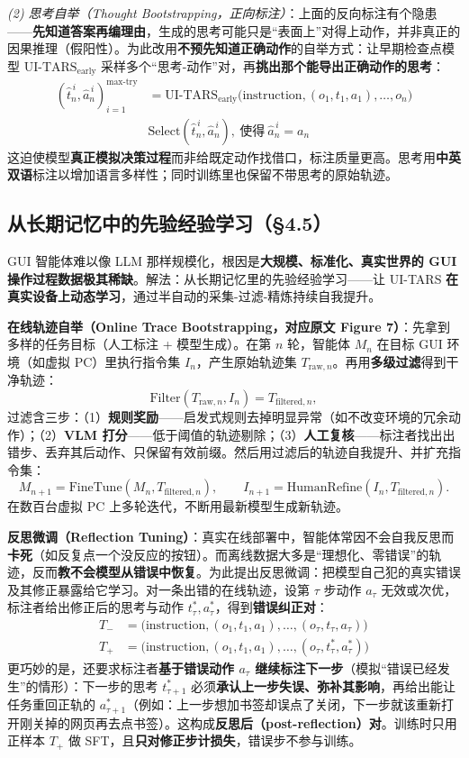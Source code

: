 \documentclass[11pt,UTF8,fontset=fandol]{ctexart}
\begin{document}
\emph{(2) 思考自举（Thought Bootstrapping，正向标注）}：上面的反向标注有个隐患——\textbf{先知道答案再编理由}，生成的思考可能只是“表面上”对得上动作，并非真正的因果推理（假阳性）。为此改用\textbf{不预先知道正确动作}的自举方式：让早期检查点模型 $\text{UI-TARS}_{\text{early}}$ 采样多个“思考-动作”对，再\textbf{挑出那个能导出正确动作的思考}：
\[
\begin{aligned}
(\hat t_n^{\,i},\hat a_n^{\,i})_{i=1}^{\text{max-try}} &= \text{UI-TARS}_{\text{early}}\big(\text{instruction},(o_1,t_1,a_1),\dots,o_n\big)\\
&\text{Select}(\hat t_n^{\,i},\hat a_n^{\,i}),\ \text{使得}\ \hat a_n^{\,i}=a_n
\end{aligned}
\]
这迫使模型\textbf{真正模拟决策过程}而非给既定动作找借口，标注质量更高。思考用\textbf{中英双语}标注以增加语言多样性；同时训练里也保留不带思考的原始轨迹。

\subsection{从长期记忆中的先验经验学习（§4.5）}

GUI 智能体难以像 LLM 那样规模化，根因是\textbf{大规模、标准化、真实世界的 GUI 操作过程数据极其稀缺}。解法：从长期记忆里的先验经验学习——让 UI-TARS \textbf{在真实设备上动态学习}，通过半自动的采集-过滤-精炼持续自我提升。

\textbf{在线轨迹自举（Online Trace Bootstrapping，对应原文 Figure 7）}：先拿到多样的任务目标（人工标注 + 模型生成）。在第 $n$ 轮，智能体 $M_n$ 在目标 GUI 环境（如虚拟 PC）里执行指令集 $I_n$，产生原始轨迹集 $T_{\text{raw},n}$。再用\textbf{多级过滤}得到干净轨迹：
\[
\mathrm{Filter}(T_{\text{raw},n},I_n)=T_{\text{filtered},n},
\]
过滤含三步：（1）\textbf{规则奖励}——启发式规则去掉明显异常（如不改变环境的冗余动作）；（2）\textbf{VLM 打分}——低于阈值的轨迹剔除；（3）\textbf{人工复核}——标注者找出出错步、丢弃其后动作、只保留有效前缀。然后用过滤后的轨迹自我提升、并扩充指令集：
\[
M_{n+1}=\mathrm{FineTune}(M_n,T_{\text{filtered},n}),\qquad
I_{n+1}=\mathrm{HumanRefine}(I_n,T_{\text{filtered},n}).
\]
在数百台虚拟 PC 上多轮迭代，不断用最新模型生成新轨迹。

\textbf{反思微调（Reflection Tuning）}：真实在线部署中，智能体常因不会自我反思而\textbf{卡死}（如反复点一个没反应的按钮）。而离线数据大多是“理想化、零错误”的轨迹，反而\textbf{教不会模型从错误中恢复}。为此提出反思微调：把模型自己犯的真实错误及其修正暴露给它学习。对一条出错的在线轨迹，设第 $\tau$ 步动作 $a_\tau$ 无效或次优，标注者给出修正后的思考与动作 $t^*_\tau, a^*_\tau$，得到\textbf{错误纠正对}：
\[
\begin{aligned}
T_- &= \big(\text{instruction},(o_1,t_1,a_1),\dots,(o_\tau,t_\tau,a_\tau)\big)\\
T_+ &= \big(\text{instruction},(o_1,t_1,a_1),\dots,(o_\tau,t^*_\tau,a^*_\tau)\big)
\end{aligned}
\]
更巧妙的是，还要求标注者\textbf{基于错误动作 $a_\tau$ 继续标注下一步}（模拟“错误已经发生”的情形）：下一步的思考 $t^*_{\tau+1}$ 必须\textbf{承认上一步失误、弥补其影响}，再给出能让任务重回正轨的 $a^*_{\tau+1}$（例如：上一步想加书签却误点了关闭，下一步就该重新打开刚关掉的网页再去点书签）。这构成\textbf{反思后（post-reflection）对}。训练时只用正样本 $T_+$ 做 SFT，且\textbf{只对修正步计损失}，错误步不参与训练。
\end{document}
